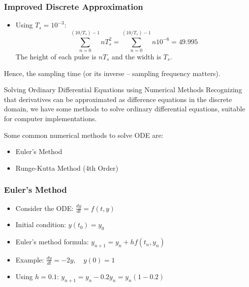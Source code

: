 \documentclass[aspectratio=169,xcolor=dvipsnames,svgnames,x11names,fleqn]{beamer}
\begin{document}
\begin{frame}
\frametitle{Improved Discrete Approximation}
\begin{itemize}
    \item Using \( T_s = 10^{-3} \):
    $$
    \sum_{n=0}^{(10/T_s)-1} nT_s^2 = \sum_{n=0}^{(10/T_s)-1} n 10^{-6} = 49.995
    $$
    The height of each pulse is $nT_s$ and the width is $T_s$.
\end{itemize}

Hence, the sampling time (or its inverse -- sampling frequency matters).
\end{frame}

\begin{frame}{Solving Ordinary Differential Equations using Numerical Methods}
Recognizing that derivatives can be approximated as difference equations in the discrete domain, we have some methods to solve ordinary differential equations, suitable for computer implementations.

Some common numerical methods to solve ODE are:
\begin{itemize}
    \item Euler's Method
    \item Runge-Kutta Method (4th Order)
\end{itemize}
\end{frame}

\begin{frame}
\frametitle{Euler's Method}
\begin{itemize}
    \item Consider the ODE: $ \frac{dy}{dt} = f(t, y) $
    \item Initial condition: $ y(t_0) = y_0 $
    \item Euler's method formula: $ y_{n+1} = y_n + h f(t_n, y_n) $
    \item Example: $ \frac{dy}{dt} = -2y, \quad y(0) = 1 $
    \item Using $ h = 0.1 $: $ y_{n+1} = y_n - 0.2y_n = y_n(1 - 0.2) $
\end{itemize}
\end{frame}
\end{document}
